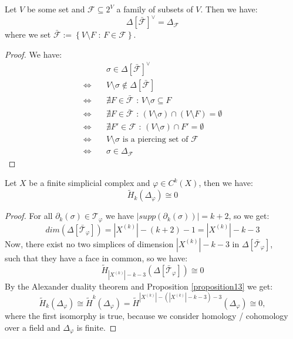 \begin{prop}\label{proposition13}
Let \(V\) be some set and \(\mathcal{F}\subseteq 2^V\) a family of subsets of \(V\). Then we have:
\[
\Delta\left[\bar{\mathcal{F}}\right]^{\lor}=\Delta_{\mathcal{F}}
\]
where we set \(\bar{\mathcal{F}}:=\left\{V\setminus F\text{ : }F\in\mathcal{F}\right\}\).
\begin{proof}
We have:
\begin{align*}
  & \sigma\in\Delta\left[\bar{\mathcal{F}}\right]^{\lor} \\
  \Longleftrightarrow \quad & V\setminus\sigma\notin\Delta\left[\bar{\mathcal{F}}\right] \\
  \Longleftrightarrow \quad & \nexists F\in\bar{\mathcal{F}}\text{ : }V\setminus\sigma\subseteq F \\
  \Longleftrightarrow \quad & \nexists F\in\bar{\mathcal{F}}\text{ : }(V\setminus\sigma)\cap(V\setminus F)=\emptyset \\
  \Longleftrightarrow \quad & \nexists F'\in\mathcal{F}\text{ : }(V\setminus\sigma)\cap F'=\emptyset \\
  \Longleftrightarrow \quad & V\setminus\sigma\text{ is a piercing set of }\mathcal{F} \\
  \Longleftrightarrow \quad & \sigma\in\Delta_{\mathcal{F}}
 \end{align*}
\end{proof}
\end{prop}

\begin{prop}
Let \(X\) be a finite simplicial complex and \(\varphi\in C^k(X)\), then we have:
\[
\tilde{H}_k(\Delta_{\varphi})\cong 0
\]
\begin{proof}
For all \(\partial_k(\sigma)\in\mathcal{T}_{\varphi}\) we have \(|supp(\partial_k(\sigma))|=k+2\), so we get:
\[
dim(\Delta[\bar{\mathcal{T}}_{\varphi}])=|X^{(k)}|-(k+2)-1=|X^{(k)}|-k-3
\]
Now, there exist no two simplices of dimension \(|X^{(k)}|-k-3\) in \(\Delta[\bar{\mathcal{T}}_{\varphi}]\),\\
such that they have a face in common, so we have:
\[
\tilde{H}_{|X^{(k)}|-k-3}(\Delta[\bar{\mathcal{T}}_{\varphi}])\cong 0
\]
By the Alexander duality theorem and Proposition \ref{proposition13} we get:
\[
\tilde{H}_k(\Delta_{\varphi})\cong\tilde{H}^k(\Delta_{\varphi})=\tilde{H}^{|X^{(k)}|-(|X^{(k)}|-k-3)-3}(\Delta_{\varphi})\cong 0,
\]
where the first isomorphy is true, because we consider homology / cohomology over a field and \(\Delta_{\varphi}\) is finite.
\end{proof}
\end{prop}


